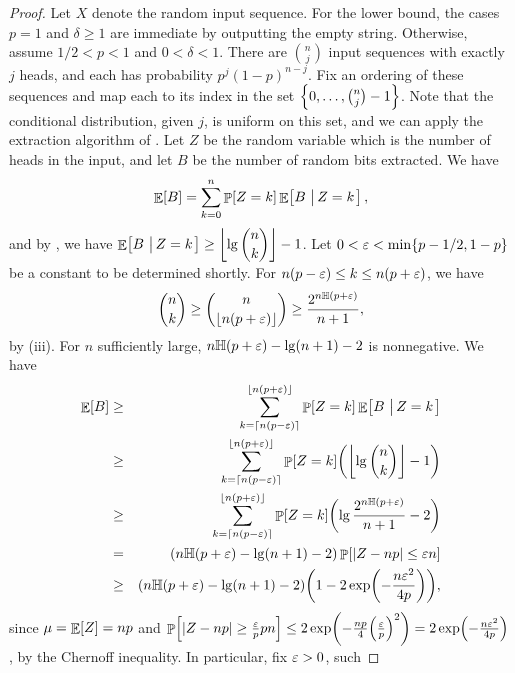 \begin{proof}
    Let $X$ denote the random input sequence.  For the lower bound, the
    cases $p=1$ and $\delta\geq1$ are immediate by outputting the empty
    string. Otherwise, assume $1/2<p<1$ and $0<\delta<1$.  There are
    $\binom{n}{j}$ input sequences with exactly $j$ heads, and each has
    probability $p^{j}(1-p)^{n-j}$. Fix an ordering of these sequences
    and map each to its index in the set
    $\left\{ {0,\ldots, \binom{n}{j}-1} \right\}$. Note that the conditional distribution,
    given $j$, is uniform on this set, and we can apply the extraction
    algorithm of . Let $Z$ be the random variable which
    is the number of heads in the input, and let $B$ be the number of
    random bits extracted. We have
    \begin{equation*}
        \Ex{B} = \sum_{k=0}^n \Prob{Z = k } \Ex{B \sep{ Z = k }},
    \end{equation*}
    and by , we have $\displaystyle \mathop{\mathbb{E}}\!\left[ {B \,\left|\, {Z = k
       } \bigr.\right.} \right] \geq \left\lfloor { \lg \binom{n}{k}} \right\rfloor -1 $. Let $0<{\varepsilon} < \min\{p-1/2,1-p\}$ be a
    constant to be determined shortly. For $n(p-{\varepsilon}) \leq k \leq n (p
    +{\varepsilon})$, we have
    \[
    \binom{n}{k} \geq \binom{n}{\floor{ n(p+\eps)} } \geq \frac{2^{n
          \Entropy{p+\eps} }}{n+1},
    \]
    by  (iii). For $n$ sufficiently large,
    $n\Entropy{p+\eps}-\lg(n+1)-2$ is nonnegative. We have
    \begin{eqnarray*}
        \Ex{B} &\geq &
        \sum_{k=\ceil{n(p-\eps)}}^{\floor{n(p+\eps)}}
        \Prob{Z = k } \Ex{B \sep{ Z = k }} \\
        &\geq &
        \sum_{k=\ceil{n(p-\eps)}}^{\floor{n(p+\eps)}}
        \Prob{Z = k } \pth{\floor{ \lg \binom{n}{k}} -1 }\\
        &\geq &
        \sum_{k=\ceil{n(p-\eps)}}^{\floor{n(p+\eps)}}
        \Prob{Z = k } \pth{\lg \frac{2^{n
                 \Entropy{p+\eps} }}{n+1} -2 }\\
        &= &
        \pth{ n  \Entropy{p+\eps} - \lg(n+1) -2 } \Prob{ \cardin{Z - np}
           \leq \eps n } \\
        &\geq &
        \pth{ n  \Entropy{p+\eps} - \lg (n+1) -2 }
        \pth{1 - 2\exp \pth{
           -\frac{n\eps^2}{4p} }},
    \end{eqnarray*}
    since $\mu = \mathop{\mathbb{E}}\!\left[ {Z} \right] = np$ and $\Prob{ \cardin{Z - np} \geq
       \frac{\eps}{p} p n } \leq 2\exp \pth{ -\frac{np}{4}
       \pth{\frac{\eps}{p}}^2 } = 2\exp \pth{ -\frac{n\eps^2}{4p} } $,
    by the Chernoff inequality. In particular, fix ${\varepsilon} > 0 $, such

\end{proof}
